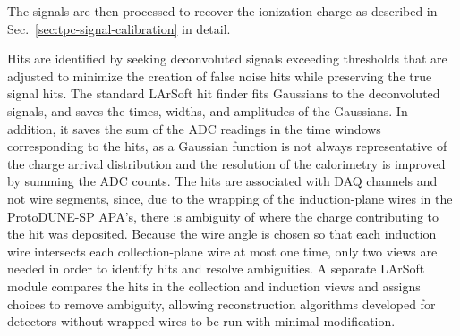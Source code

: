 The %
 signals are then processed to recover the ionization charge
as described in Sec.~\ref{sec:tpc-signal-calibration} in detail. 
%

%
Hits are identified by seeking deconvoluted signals exceeding
thresholds that are adjusted to minimize the creation of false noise
hits while preserving the true signal hits.  The standard LArSoft hit
finder fits Gaussians to the deconvoluted signals, and saves the
times, widths, and amplitudes of the Gaussians.  In addition, it saves the sum of
the ADC readings in the time windows corresponding to the hits, as a
Gaussian function is not always representative of the charge arrival
distribution and the resolution of the calorimetry is improved by
summing the ADC counts.  The hits are associated with DAQ channels and
not wire segments, since, due to the wrapping of the induction-plane
wires in the ProtoDUNE-SP APA's, there is ambiguity of where the
charge contributing to the hit was deposited.  Because the wire angle
is chosen so that each induction wire intersects each collection-plane
wire at most one time, only two views are needed in order to identify
hits and resolve ambiguities.  A separate LArSoft module compares the
hits in the collection and induction views and assigns choices to
remove ambiguity, 
allowing reconstruction algorithms developed for
detectors without wrapped wires to be run with minimal modification.

